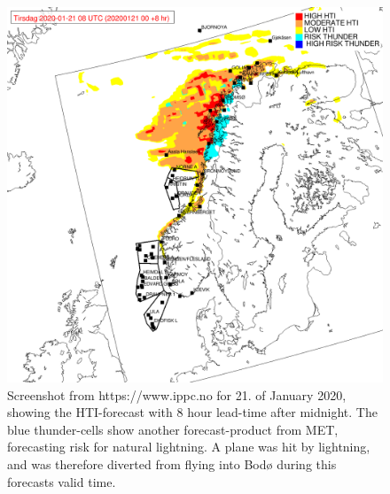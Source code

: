 \begin{figure}
    \centering
    \includegraphics[width=\textwidth]{Figures/hti.png}
    \caption{Screenshot from https://www.ippc.no for 21. of January 2020, showing the HTI-forecast with 8 hour lead-time after midnight. The blue thunder-cells show another forecast-product from MET, forecasting risk for natural lightning. A plane was hit by lightning, and was therefore diverted from flying into Bodø during this forecasts valid time. }
    \label{fig:hti}
\end{figure}

